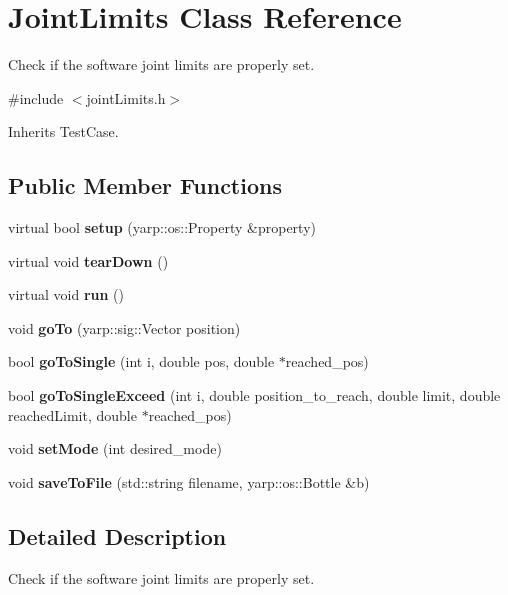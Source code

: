 \section{Joint\+Limits Class Reference}
\label{classJointLimits}


Check if the software joint limits are properly set.  




{\ttfamily \#include $<$joint\+Limits.\+h$>$}



Inherits Test\+Case.

\subsection*{Public Member Functions}
\begin{DoxyCompactItemize}
\item 
\mbox{\label{classJointLimits_aab2cba8458562fa010452d40812d2088}} 
virtual bool {\bfseries setup} (yarp\+::os\+::\+Property \&property)
\item 
\mbox{\label{classJointLimits_af90bca494fc174654dbd23050438f677}} 
virtual void {\bfseries tear\+Down} ()
\item 
\mbox{\label{classJointLimits_a7d638220c08c9c3c500ffb6b4ecfcaa9}} 
virtual void {\bfseries run} ()
\item 
\mbox{\label{classJointLimits_af409fb877cde1701963fa0d5bcbb12be}} 
void {\bfseries go\+To} (yarp\+::sig\+::\+Vector position)
\item 
\mbox{\label{classJointLimits_a5a4a3ea41f4fb7c0e9d93fbc75a6c71c}} 
bool {\bfseries go\+To\+Single} (int i, double pos, double $\ast$reached\+\_\+pos)
\item 
\mbox{\label{classJointLimits_a8430fc193c56418843c67ddde4966571}} 
bool {\bfseries go\+To\+Single\+Exceed} (int i, double position\+\_\+to\+\_\+reach, double limit, double reached\+Limit, double $\ast$reached\+\_\+pos)
\item 
\mbox{\label{classJointLimits_ae4d5b348e7689e4c1382252bcbb0ae0a}} 
void {\bfseries set\+Mode} (int desired\+\_\+mode)
\item 
\mbox{\label{classJointLimits_a0790f6c7d9d1886aaa1bb4848cf790ef}} 
void {\bfseries save\+To\+File} (std\+::string filename, yarp\+::os\+::\+Bottle \&b)
\end{DoxyCompactItemize}


\subsection{Detailed Description}
Check if the software joint limits are properly set. 

